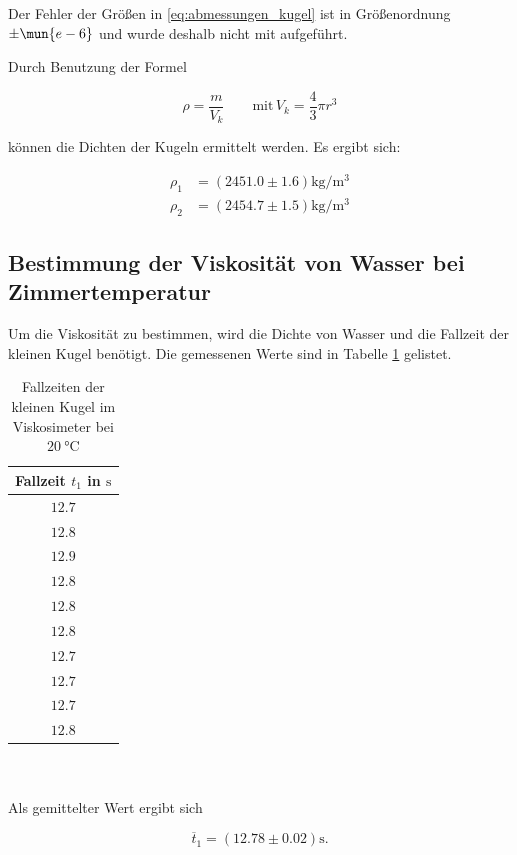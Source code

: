 Der Fehler der Größen in \eqref{eq:abmessungen_kugel} ist in Größenordnung $\pm \mun{e-6}$
und wurde deshalb nicht mit aufgeführt.

Durch Benutzung der Formel %

\begin{equation*}
\rho=\frac{m}{V_{k}} \qquad \text{mit} \, V_{k}=\frac{4}{3}\pi r^3
\end{equation*}

können die Dichten der Kugeln ermittelt werden.
Es ergibt sich:

\begin{align*}
\rho_{1}&=\left(\num{2451.0}\pm\num{1.6}\right) \si{\kilogram\per\cubic\meter}\\
\rho_{2}&=\left(\num{2454.7}\pm\num{1.5}\right) \si{\kilogram\per\cubic\meter}
\end{align*}

\subsection{Bestimmung der Viskosität von Wasser bei Zimmertemperatur} \label{sec:visko}
Um die Viskosität zu bestimmen, wird die Dichte von Wasser und die Fallzeit der kleinen Kugel benötigt.
Die gemessenen Werte sind in Tabelle \ref{tab:messwerte_fallzeit_kugel_klein} gelistet. %
\begin{table}
\centering
\begin{tabular} {c}
	\toprule
  Fallzeit $t_1$ in $\si{\second}$ \\
  \midrule
  $\num{12.7}$ \\
  $\num{12.8}$ \\
  $\num{12.9}$ \\
  $\num{12.8}$ \\
  $\num{12.8}$ \\
  $\num{12.8}$ \\
  $\num{12.7}$ \\
  $\num{12.7}$ \\
  $\num{12.7}$ \\
  $\num{12.8}$ \\
\bottomrule
\end{tabular}
\caption{Fallzeiten der kleinen Kugel im Viskosimeter bei $\SI{20}{\degreeCelsius}$}
\label{tab:messwerte_fallzeit_kugel_klein}
\end{table}
\\
\\
\hfill
Als gemittelter Wert ergibt sich

\begin{equation}
\label{eq:gemittelte_fallzeit_klein}
\overline{t}_{1}=\left(\num{12.78}\pm\num{0.02}\right) \si{\second}.
\end{equation}

